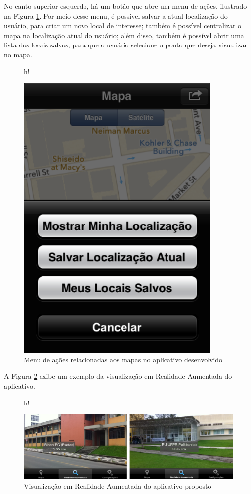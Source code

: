No canto superior esquerdo, há um botão que abre um menu de ações, ilustrado na 
Figura \ref{fig:maps-action-menu}. Por meio desse menu, é possível salvar a
atual localização do usuário, para criar um novo local de interesse; também é
possível centralizar o mapa na localização atual do usuário; além disso, também
é possível abrir uma lista dos locais salvos, para que o usuário selecione o ponto
que deseja visualizar no mapa.

\begin{figure}{h!}
    \centering
    \caption{Menu de ações relacionadas aos mapas no aplicativo desenvolvido}
    \label{fig:maps-action-menu}
    \includegraphics[width=10cm]{resources/App_Maps_Screenshots/action-menu.png}
\end{figure}



A Figura \ref{fig:App-AR-Screenshot} exibe um exemplo da visualização em Realidade Aumentada
do aplicativo.

\begin{figure}{h!}
    \centering
    \caption{Visualização em Realidade Aumentada do aplicativo proposto}
    \label{fig:App-AR-Screenshot}
    \includegraphics[width=17cm]{resources/App_AR_Screenshots/AR-sceenshot.png}
\end{figure}



